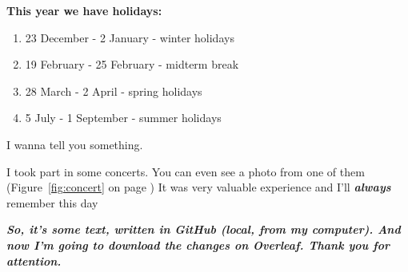 \textbf{\large This year we have holidays:}
\begin{enumerate}
    \item 23 December - 2 January - winter holidays
    \item 19 February - 25 February - midterm break
    \item 28 March - 2 April - spring holidays
    \item 5 July - 1 September - summer holidays
\end{enumerate}

\begin{center}
    {\large I wanna tell you something.}
    
    I took part in some concerts. You can even see a photo from one of them (Figure~\ref{fig:concert} on page \pageref{fig:concert}) It was very valuable experience and I'll \textbf{\emph{always}} remember this day \par 
    
\end{center}

\emph{\textbf{\large So, it's some text, written in GitHub (local, from my computer). And now I'm going to download the changes on Overleaf. Thank you for attention.}}